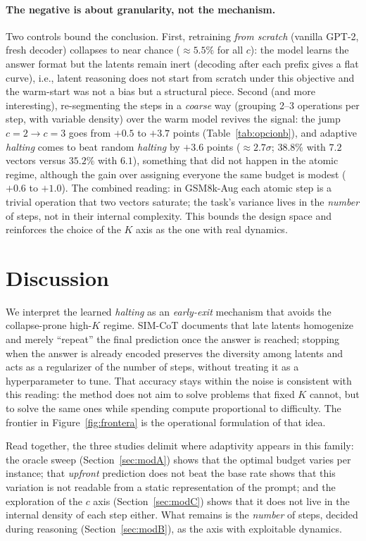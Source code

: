 \documentclass[11pt]{article}
\begin{document}
\paragraph{The negative is about granularity, not the mechanism.} Two controls bound the conclusion. First, retraining \emph{from scratch} (vanilla GPT-2, fresh decoder) collapses to near chance ($\approx 5.5\%$ for all $c$): the model learns the answer format but the latents remain inert (decoding after each prefix gives a flat curve), i.e., latent reasoning does not start from scratch under this objective and the warm-start was not a bias but a structural piece. Second (and more interesting), re-segmenting the steps in a \emph{coarse} way (grouping 2--3 operations per step, with variable density) over the warm model revives the signal: the jump $c{=}2 \rightarrow c{=}3$ goes from $+0.5$ to $+3.7$ points (Table~\ref{tab:opcionb}), and adaptive \textit{halting} comes to beat random \textit{halting} by $+3.6$ points ($\approx 2.7\sigma$; $38.8\%$ with $7.2$ vectors versus $35.2\%$ with $6.1$), something that did not happen in the atomic regime, although the gain over assigning everyone the same budget is modest ($+0.6$ to $+1.0$). The combined reading: in GSM8k-Aug each atomic step is a trivial operation that two vectors saturate; the task's variance lives in the \emph{number} of steps, not in their internal complexity. This bounds the design space and reinforces the choice of the $K$ axis as the one with real dynamics.

\section{Discussion}

We interpret the learned \textit{halting} as an \emph{early-exit} mechanism that avoids the collapse-prone high-$K$ regime. SIM-CoT \citep{wei2025simcot} documents that late latents homogenize and merely ``repeat'' the final prediction once the answer is reached; stopping when the answer is already encoded preserves the diversity among latents and acts as a regularizer of the number of steps, without treating it as a hyperparameter to tune. That accuracy stays within the noise is consistent with this reading: the method does not aim to solve problems that fixed $K$ cannot, but to solve the same ones while spending compute proportional to difficulty. The frontier in Figure~\ref{fig:frontera} is the operational formulation of that idea.

Read together, the three studies delimit where adaptivity appears in this family: the oracle sweep (Section~\ref{sec:modA}) shows that the optimal budget varies per instance; that \textit{upfront} prediction does not beat the base rate shows that this variation is not readable from a static representation of the prompt; and the exploration of the $c$ axis (Section~\ref{sec:modC}) shows that it does not live in the internal density of each step either. What remains is the \emph{number} of steps, decided during reasoning (Section~\ref{sec:modB}), as the axis with exploitable dynamics.
\end{document}
